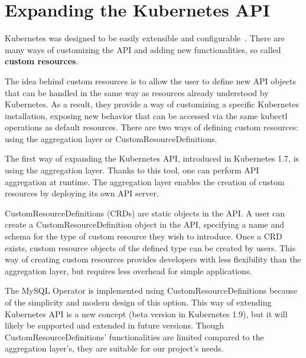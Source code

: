\section{Expanding the Kubernetes API}
Kubernetes was designed to be easily extensible and configurable~\cite{extending-kubeapi}. There are
many ways of customizing the API and adding new functionalities, so called \textbf{custom resources}.

The idea behind custom resources is to allow the user to define new API objects that can be handled
in the same way as resources already understood by Kubernetes. As a result, they provide a way of
customizing a specific Kubernetes installation, exposing new behavior that can be accessed via the
same kubectl operations as default resources. There are two ways of defining custom resources: using
the aggregation layer or CustomResourceDefinitions.

The first way of expanding the Kubernetes API, introduced in Kubernetes 1.7, is using the
aggregation layer. Thanks to this tool, one can perform API aggregation at runtime. The aggregation
layer enables the creation of custom resources by deploying its own API server.

CustomResourceDefinitions (CRDs) are static objects in the API. A user can create a
CustomResourceDefinition object in the API, specifying a name and schema for the type of custom
resource they wish to introduce. Once a CRD exists, custom resource objects of the defined type can
be created by users. This way of creating custom resources provides developers with less flexibility
than the aggregation layer, but requires less overhead for simple applications.

The MySQL Operator is implemented using CustomResourceDefinitions because of the simplicity and
modern design of this option. This way of extending Kubernetes API is a new concept (beta version in
Kubernetes 1.9), but it will likely be supported and extended in future versions. Though
CustomResourceDefinitions’ functionalities are limited compared to the aggregation layer’s, they
are suitable for our project’s needs.
